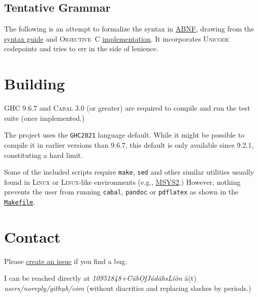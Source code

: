 \documentclass[11pt]{article}
\newcommand{\link}[2]{\underline{\color{darkblue}\href{#1}{#2}}}
\begin{document}
  \subsection*{Tentative Grammar}
  The following is an attempt to formalize the syntax in
  \href{https://datatracker.ietf.org/doc/html/rfc5234}{\textsc{ABNF}},
  drawing from the \href{https://fountain.io/syntax/}{syntax guide} and
  \textsc{Objective~C}
  \link{https://github.com/nyousefi/Fountain}{implementation}.
  It incorporates \textsc{Unicode} codepoints and tries to err in the
  side of lenience.
  
  

\section*{Building}
\textsc{GHC} 9.6.7 and \textsc{Cabal} 3.0 (or greater) are required to
compile and run the test suite (once implemented.)

The project uses the \texttt{GHC2021} language default. While it might
be possible to compile it in earlier versions than 9.6.7, this default
is only available since 9.2.1, constituting a hard limit.

Some of the included scripts require \texttt{make}, \texttt{sed} and
other similar utilities usually found in \textsc{Linux} or
\textsc{Linux}-like environments (e.g.,
\link{https://www.msys2.org/}{\textsc{MSYS2}}.) However, nothing
prevents the user from running \texttt{cabal}, \texttt{pandoc} or
\texttt{pdflatex} as shown in the
\link{run:./Makefile}{\texttt{Makefile}}.

\section*{Contact} Please
\link{https://github.com/CubOfJudahsLion/fountain-parser/issues}{create an issue}
if you find a bug.

I can be reached directly at
\textrm{\emph{10951848+C\"{u}b\b{O}fJ\'{u}d\~{a}hsL\^{i}\`{o}n} \u{a}(t)
\emph{users/noreply/g\={i}th\d{u}b/c\.{o}m}} (without diacritics and
replacing slashes by periods.)
\end{document}
